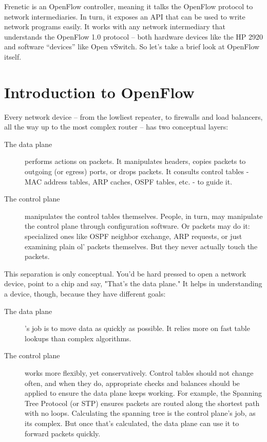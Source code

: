 Frenetic is an OpenFlow controller, meaning it talks the OpenFlow protocol to network intermediaries.  
In turn, it exposes an API that can be used to write network programs easily.
It works with any network intermediary that understands the OpenFlow 1.0 protocol -- 
both hardware devices like the HP 2920 and software ``devices'' like Open vSwitch.  
So let's take a brief look at OpenFlow itself.

\section{Introduction to OpenFlow}

Every network device -- from the lowliest repeater, to firewalls and load balancers, all the way up to the most complex router -- has two conceptual layers:

\begin{description}
\item[The data plane] performs actions on packets.   
It manipulates headers, copies packets to outgoing (or egress) ports, or drops packets.
It consults control tables - MAC address tables, ARP caches, OSPF tables, etc. - to guide it.  
\item[The control plane] manipulates the control tables themselves.
People, in turn, may manipulate the control plane through configuration software.
Or packets may do it: specialized ones like OSPF neighbor exchange, ARP requests, or just examining plain ol'
packets themselves.
But they never actually touch the packets.
\end{description}

This separation is only conceptual.
You'd be hard pressed to open a network device, point to a chip and say, "That's the data plane."
It helps in understanding a device, though, because they have different goals:

\begin{description}
\item[The data plane]'s job is to move data as quickly as possible.
It relies more on fast table lookups than complex algorithms.
\item[The control plane] works more flexibly, yet conservatively.
Control tables should not change often, and when they do, appropriate checks and balances should be applied to
ensure the data plane keeps working.  
For example, the Spanning Tree Protocol (or STP) ensures packets are routed along the shortest path with no
loops.  
Calculating the spanning tree is the control plane's job, as its complex. 
But once that's calculated, the data plane can use it to forward packets quickly.
\end{description}

